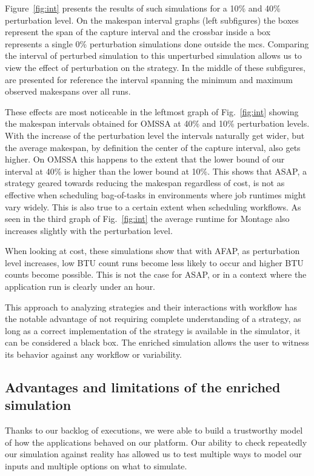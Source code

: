 \documentclass[10pt,conference,compsocconf]{IEEEtran}
\begin{document}
Figure~\ref{fig:int} presents  the results  of such simulations  for a  10\% and
40\% perturbation level.  On the  makespan interval graphs (left subfigures) the
boxes represent the span  of the capture interval and the  crossbar inside a box
represents   a   single   0\%   perturbation  simulations   done   outside   the
\ac{mcs}. Comparing  the interval  of perturbed  simulation to  this unperturbed
simulation allows us to view the effect  of perturbation on the strategy. In the
middle of these subfigures,  are presented  for  reference the  interval 
spanning  the minimum and maximum observed makespans over all runs.

These effects are most noticeable in the leftmost graph of Fig.~\ref{fig:int}
showing the makespan intervals obtained for OMSSA at 40\% and 10\% perturbation
levels. With the increase of the perturbation level the intervals naturally get 
wider, but the average makespan, by definition the center of the capture 
interval, also gets higher. On OMSSA this happens to the extent that the lower 
bound of our interval at 40\% is higher than the lower bound at 10\%.
This shows that ASAP, a strategy geared towards reducing the makespan regardless
of cost, is not as effective when scheduling bag-of-tasks in environments where
job runtimes might vary widely.  This is also true to a certain extent when
scheduling workflows. As seen in the third graph of Fig.~\ref{fig:int} the
average runtime for Montage also increases slightly with the perturbation level.

When looking at cost, these simulations show that with AFAP, as
perturbation level increases, low BTU count runs become less likely to occur and
higher BTU counts become possible. This is not the case for ASAP, or in a 
context where the application run is clearly under an hour.

This approach to analyzing strategies and their interactions with workflow has
the notable advantage of not requiring complete understanding of a strategy, as
long as a correct implementation of the strategy is available in the simulator,
it can be considered a black box. The enriched simulation allows the user to
witness its behavior against any workflow or variability.


\subsection{Advantages and limitations of the enriched simulation}\label{sec:lim}

Thanks to our backlog of executions, we were able to build a trustworthy model
of how the applications behaved on our platform. Our ability to check repeatedly
our simulation against reality has allowed us to test multiple ways to model 
our inputs and multiple options on what to simulate. 
\end{document}
